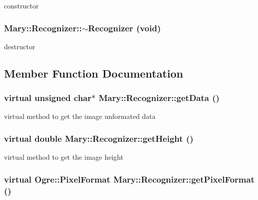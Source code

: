 constructor \hypertarget{class_mary_1_1_recognizer_062ba77cf858f8f93c5f8f72361c3c36}{
\subsubsection[$\sim$Recognizer]{\setlength{\rightskip}{0pt plus 5cm}Mary::Recognizer::$\sim$Recognizer (void)}}
\label{class_mary_1_1_recognizer_062ba77cf858f8f93c5f8f72361c3c36}


destructor 

\subsection{Member Function Documentation}
\hypertarget{class_mary_1_1_recognizer_4dd5b353b3c95eb4d3c9862ffc6833ff}{
\subsubsection[getData]{\setlength{\rightskip}{0pt plus 5cm}virtual unsigned char$\ast$ Mary::Recognizer::getData ()}}
\label{class_mary_1_1_recognizer_4dd5b353b3c95eb4d3c9862ffc6833ff}


virtual method to get the image unformated data \hypertarget{class_mary_1_1_recognizer_3862b6b1cbef243f201c82a9757210cf}{
\subsubsection[getHeight]{\setlength{\rightskip}{0pt plus 5cm}virtual double Mary::Recognizer::getHeight ()}}
\label{class_mary_1_1_recognizer_3862b6b1cbef243f201c82a9757210cf}


virtual method to get the image height \hypertarget{class_mary_1_1_recognizer_a8807eec0bac6da199f4b69a8f506a40}{
\subsubsection[getPixelFormat]{\setlength{\rightskip}{0pt plus 5cm}virtual Ogre::PixelFormat Mary::Recognizer::getPixelFormat ()}}
\label{class_mary_1_1_recognizer_a8807eec0bac6da199f4b69a8f506a40}


